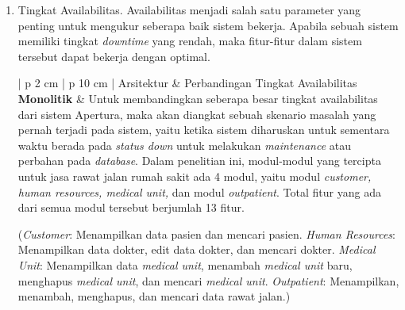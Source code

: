 \begin{enumerate}[leftmargin=*]
\begin{table}[H]
\begin{adjustbox}{width=1\textwidth}
\begin{tabular}{| p {2 cm} | p {10 cm} |}
				Namun masalah \textit{bottleneck effect} dapat lebih teratasi pada arsitektur microservice, dikarenakan antrian \textit{request} dapat diurai sesuai dengan modul yang akan memberikan \textit{response} balasan, menjadikan sistem lebih \textit{responsive} terhadap \textit{request} yang banyak. Pada contoh kasus, \textit{user} yang ingin meminta jadwal unit medis bertugas tidak perlu antri dengan \textit{user} yang melakukan \textit{request} pendaftaran rawat jalan dikarena \textit{handler} modul rawat jalan dengan unit medis sudah \textit{independent}, menjadikan kinerja sistem lebih cepat.\\
				\hline
			\end{tabular}
		\end{adjustbox}
	\end{table}
	\newpage
	\item Tingkat Availabilitas. Availabilitas menjadi salah satu parameter yang penting untuk mengukur seberapa baik sistem bekerja. Apabila sebuah sistem memiliki tingkat \textit{downtime} yang rendah, maka fitur-fitur dalam sistem tersebut dapat bekerja dengan optimal.
	\begin{table}[H]
		\small
		\begin{adjustbox}{width=1\textwidth}
			\begin{tabular}{| p {2 cm} | p {10 cm} |}
				\hline
				Arsitektur & Perbandingan Tingkat Availabilitas\\
				\hline
				\textbf{Monolitik} & Untuk membandingkan seberapa besar tingkat availabilitas dari sistem Apertura, maka akan diangkat sebuah skenario masalah yang pernah terjadi pada sistem, yaitu ketika sistem diharuskan untuk sementara waktu berada pada \textit{status down} untuk melakukan \textit{maintenance} atau perbahan pada \textit{database}. Dalam penelitian ini, modul-modul yang tercipta untuk jasa rawat jalan rumah sakit ada 4 modul, yaitu modul \textit{customer, human resources, medical unit,} dan modul \textit{outpatient}. Total fitur yang ada dari semua modul tersebut berjumlah 13 fitur.
				
				(\textit{Customer}: Menampilkan data pasien dan mencari pasien. \textit{Human Resources}: Menampilkan data dokter, edit data dokter, dan mencari dokter. \textit{Medical Unit}: Menampilkan data \textit{medical unit}, menambah \textit{medical unit} baru, menghapus \textit{medical unit}, dan mencari \textit{medical unit}. \textit{Outpatient}: Menampilkan, menambah, menghapus, dan mencari data rawat jalan.)
				

\end{tabular}
\end{adjustbox}
\end{table}
\end{enumerate}

